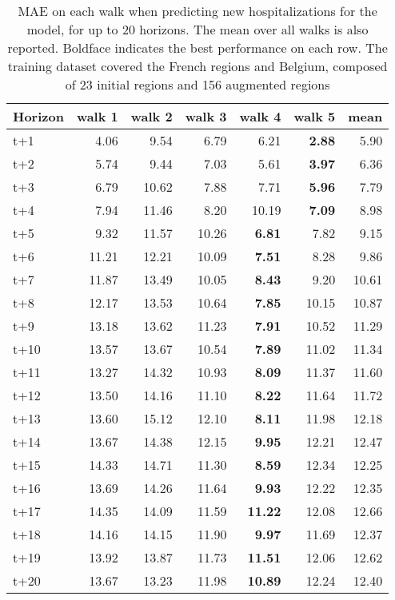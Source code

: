 \begin{table}[H]
\centering
\caption{MAE on each walk when predicting new hospitalizations for the model, for up to 20 horizons. The mean over all walks is also reported. Boldface indicates the best performance on each row. The training dataset covered the French regions and Belgium, composed of 23 initial regions and 156 augmented regions }
\label{tab:MAE_walk_dense_model}
\begin{tabular}{lrrrrrr}
\toprule
Horizon &  walk 1 &  walk 2 &  walk 3 &  walk 4 &  walk 5 &  mean \\
\midrule
t+1  & 4.06  & 9.54  & 6.79  & 6.21  & \textbf{2.88}  & 5.90  \\
t+2  & 5.74  & 9.44  & 7.03  & 5.61  & \textbf{3.97}  & 6.36  \\
t+3  & 6.79  & 10.62  & 7.88  & 7.71  & \textbf{5.96}  & 7.79  \\
t+4  & 7.94  & 11.46  & 8.20  & 10.19  & \textbf{7.09}  & 8.98  \\
t+5  & 9.32  & 11.57  & 10.26  & \textbf{6.81}  & 7.82  & 9.15  \\
t+6  & 11.21  & 12.21  & 10.09  & \textbf{7.51}  & 8.28  & 9.86  \\
t+7  & 11.87  & 13.49  & 10.05  & \textbf{8.43}  & 9.20  & 10.61  \\
t+8  & 12.17  & 13.53  & 10.64  & \textbf{7.85}  & 10.15  & 10.87  \\
t+9  & 13.18  & 13.62  & 11.23  & \textbf{7.91}  & 10.52  & 11.29  \\
t+10  & 13.57  & 13.67  & 10.54  & \textbf{7.89}  & 11.02  & 11.34  \\
t+11  & 13.27  & 14.32  & 10.93  & \textbf{8.09}  & 11.37  & 11.60  \\
t+12  & 13.50  & 14.16  & 11.10  & \textbf{8.22}  & 11.64  & 11.72  \\
t+13  & 13.60  & 15.12  & 12.10  & \textbf{8.11}  & 11.98  & 12.18  \\
t+14  & 13.67  & 14.38  & 12.15  & \textbf{9.95}  & 12.21  & 12.47  \\
t+15  & 14.33  & 14.71  & 11.30  & \textbf{8.59}  & 12.34  & 12.25  \\
t+16  & 13.69  & 14.26  & 11.64  & \textbf{9.93}  & 12.22  & 12.35  \\
t+17  & 14.35  & 14.09  & 11.59  & \textbf{11.22}  & 12.08  & 12.66  \\
t+18  & 14.16  & 14.15  & 11.90  & \textbf{9.97}  & 11.69  & 12.37  \\
t+19  & 13.92  & 13.87  & 11.73  & \textbf{11.51}  & 12.06  & 12.62  \\
t+20  & 13.67  & 13.23  & 11.98  & \textbf{10.89}  & 12.24  & 12.40  \\

\bottomrule
\end{tabular}
\end{table}
